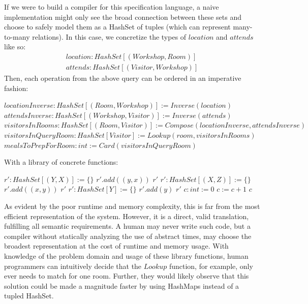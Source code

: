 \documentclass{article}
\begin{document}
If we were to build a compiler for this specification language, a naive implementation might only see the broad connection between these sets and choose to safely model them as a HashSet of tuples (which can represent many-to-many relations). In this case, we concretize the types of $location$ and $attends$ like so:
\begin{gather*}
    location: HashSet[(Workshop, Room)]\\
    attends: HashSet[(Visitor, Workshop)]
\end{gather*}
Then, each operation from the above query can be ordered in an imperative fashion:
\begin{algorithmic}
    \State $locationInverse: HashSet[(Room, Workshop)] := Inverse(location)$
    \State $attendsInverse: HashSet[(Workshop, Visitor)] := Inverse(attends)$
    \State $visitorsInRooms: HashSet[(Room, Visitor)] := Compose(locationInverse, attendsInverse)$
    \State $visitorsInQueryRoom: HashSet[Visitor] := Lookup(room, visitorsInRooms)$
    \State $mealsToPrepForRoom: int := Card(visitorsInQueryRoom)$
\end{algorithmic}
With a library of concrete functions:
\begin{algorithmic}
        \State $r': HashSet[(Y, X)] := \{\}$
            \State $r'.add((y,x))$ 
        \EndFor
        \Return $r'$
    \EndFunction
        \State $r': HashSet[(X,Z)] := \{\}$
                    \State $r'.add((x,y))$
                \EndIf
            \EndFor
        \EndFor
        \Return $r'$
    \EndFunction
        \State $r': HashSet[Y] := \{\}$
                \State $r'.add(y)$
            \EndIf
        \EndFor
        \Return $r'$
    \EndFunction
        \State $c: int := 0$
            \State $c := c + 1$
        \EndFor
        \Return $c$
    \EndFunction
\end{algorithmic}
As evident by the poor runtime and memory complexity, this is far from the most efficient representation of the system. However, it is a direct, valid translation, fulfilling all semantic requirements. A human may never write such code, but a compiler without statically analyzing the use of abstract times, may choose the broadest representation at the cost of runtime and memory usage. With knowledge of the problem domain and usage of these library functions, human programmers can intuitively decide that the $Lookup$ function, for example, only ever needs to match for one room. Further, they would likely observe that this solution could be made a magnitude faster by using HashMaps instead of a tupled HashSet.
\end{document}
